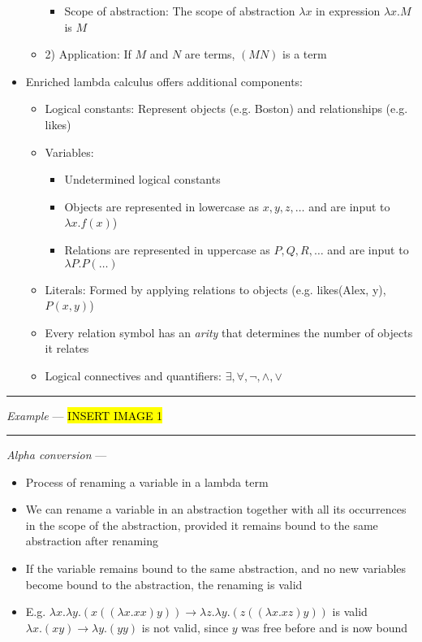\begin{itemize}
\begin{itemize}
\begin{itemize}
\begin{itemize}
            \end{itemize}
            \item Scope of abstraction: The scope of abstraction $\lambda x$ in expression $\lambda x.M$ is $M$
        \end{itemize}
        \item 2) Application: If $M$ and $N$ are terms, $(MN)$ is a term
    \end{itemize}
    \item Enriched lambda calculus offers additional components:
    \begin{itemize}
        \item Logical constants: Represent objects (e.g. Boston) and relationships (e.g. likes)
        \item Variables:
        \begin{itemize}
            \item Undetermined logical constants
            \item Objects are represented in lowercase as $x, y, z, \dots$ and are input to $\lambda x.f(x)$)
            \item Relations are represented in uppercase as $P, Q, R, \dots$ and are input to $\lambda P.P(\dots)$
        \end{itemize}
        \item Literals: Formed by applying relations to objects (e.g. likes(Alex, y), $P(x, y)$)
        \item Every relation symbol has an \emph{arity} that determines the number of objects it relates
        \item Logical connectives and quantifiers: $\exists, \forall, \neg, \land, \lor$
    \end{itemize}
\end{itemize}

{\color{lightgray}\hrule height 0.001mm}

\emph{Example} ---
\hl{INSERT IMAGE 1}

{\color{lightgray}\hrule height 0.001mm}

\emph{Alpha conversion} ---
\begin{itemize}
    \item Process of renaming a variable in a lambda term
    \item We can rename a variable in an abstraction together with all its occurrences in the scope of the abstraction, provided it remains bound to the same abstraction after renaming
    \item If the variable remains bound to the same abstraction, and no new variables become bound to the abstraction, the renaming is valid
    \item E.g. 
    $\lambda x.\lambda y.(x((\lambda x. x x) y )) \to \lambda z. \lambda y. (z((\lambda x. x z) y))$ is valid\\
    $\lambda x.(xy) \to \lambda y.(yy)$ is not valid, since $y$ was free before and is now bound
\end{itemize}

